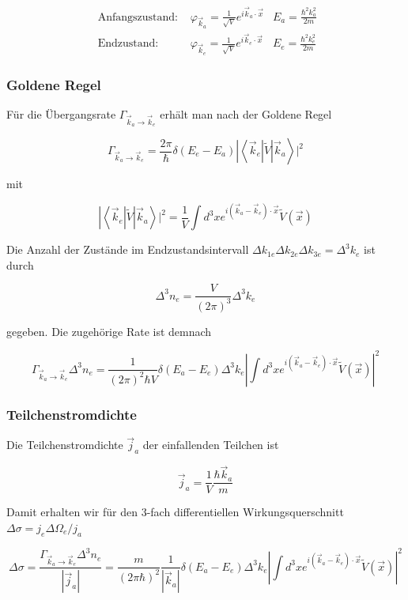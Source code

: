 \documentclass[10pt, letterpaper]{article}
\begin{document}
$$
\begin{array}{lll}
\text { Anfangszustand: } & \varphi_{\vec{k}_{a}}=\frac{1}{\sqrt{V}} e^{i \vec{k}_{a} \cdot \vec{x}} & E_{a}=\frac{\hbar^{2} k_{a}^{2}}{2 m} \\
\text { Endzustand: } & \varphi_{\vec{k}_{e}}=\frac{1}{\sqrt{V}} e^{i \vec{k}_{e} \cdot \vec{x}} & E_{e}=\frac{\hbar^{2} k_{e}^{2}}{2 m}
\end{array}
$$

\subsubsection*{Goldene Regel}
Für die Übergangsrate $\Gamma_{\vec{k}_{a} \rightarrow \vec{k}_{e}}$ erhält man nach der Goldene Regel

$$
\left.\Gamma_{\vec{k}_{a} \rightarrow \vec{k}_{e}}=\frac{2 \pi}{\hbar} \delta\left(E_{e}-E_{a}\right)\left|\left\langle\vec{k}_{e}\right| \tilde{V}\right| \vec{k}_{a}\right\rangle\left.\right|^{2}
$$

mit

$$
\left.\left|\left\langle\vec{k}_{e}\right| \tilde{V}\right| \vec{k}_{a}\right\rangle\left.\right|^{2}=\frac{1}{V} \int d^{3} x e^{i\left(\vec{k}_{a}-\vec{k}_{e}\right) \cdot \vec{x}} \tilde{V}(\vec{x})
$$

Die Anzahl der Zustände im Endzustandsintervall $\Delta k_{1 e} \Delta k_{2 e} \Delta k_{3 e}=\Delta^{3} k_{e}$ ist durch

$$
\Delta^{3} n_{e}=\frac{V}{(2 \pi)^{3}} \Delta^{3} k_{e}
$$

gegeben. Die zugehörige Rate ist demnach

$$
\Gamma_{\vec{k}_{a} \rightarrow \vec{k}_{e}} \Delta^{3} n_{e}=\frac{1}{(2 \pi)^{2} \hbar V} \delta\left(E_{a}-E_{e}\right) \Delta^{3} k_{e}\left|\int d^{3} x e^{i\left(\vec{k}_{a}-\vec{k}_{e}\right) \cdot \vec{x}} \tilde{V}(\vec{x})\right|^{2}
$$

\subsubsection*{Teilchenstromdichte}
Die Teilchenstromdichte $\vec{j}_{a}$ der einfallenden Teilchen ist

$$
\vec{j}_{a}=\frac{1}{V} \frac{\hbar \vec{k}_{a}}{m}
$$

Damit erhalten wir für den 3-fach differentiellen Wirkungsquerschnitt $\Delta \sigma=j_{e} \Delta \Omega_{e} / j_{a}$

$$
\Delta \sigma=\frac{\Gamma_{\vec{k}_{a} \rightarrow \vec{k}_{e}} \Delta^{3} n_{e}}{\left|\vec{j}_{a}\right|}=\frac{m}{(2 \pi \hbar)^{2}} \frac{1}{\left|\vec{k}_{a}\right|} \delta\left(E_{a}-E_{e}\right) \Delta^{3} k_{e}\left|\int d^{3} x e^{i\left(\vec{k}_{a}-\vec{k}_{e}\right) \cdot \vec{x}} \tilde{V}(\vec{x})\right|^{2}
$$
\end{document}

